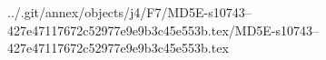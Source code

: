 ../.git/annex/objects/j4/F7/MD5E-s10743--427e47117672c52977e9e9b3c45e553b.tex/MD5E-s10743--427e47117672c52977e9e9b3c45e553b.tex